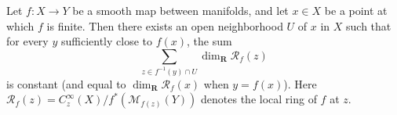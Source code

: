 Let $f: X \to Y$ be a smooth map between manifolds, and let $x \in X$ be a point at which $f$ is finite. Then there exists an open neighborhood $U$ of $x$ in $X$ such that for every $y$ sufficiently close to $f(x)$, the sum
$$\sum_{z \in f^{-1}(y) \cap U} \dim_{\mathbf{R}} \mathcal{R}_f(z)$$
is constant (and equal to $\dim_{\mathbf{R}} \mathcal{R}_f(x)$ when $y = f(x)$). Here $\mathcal{R}_f(z) = C_z^\infty(X) / f^*(\mathcal{M}_{f(z)}(Y))$ denotes the local ring of $f$ at $z$.

